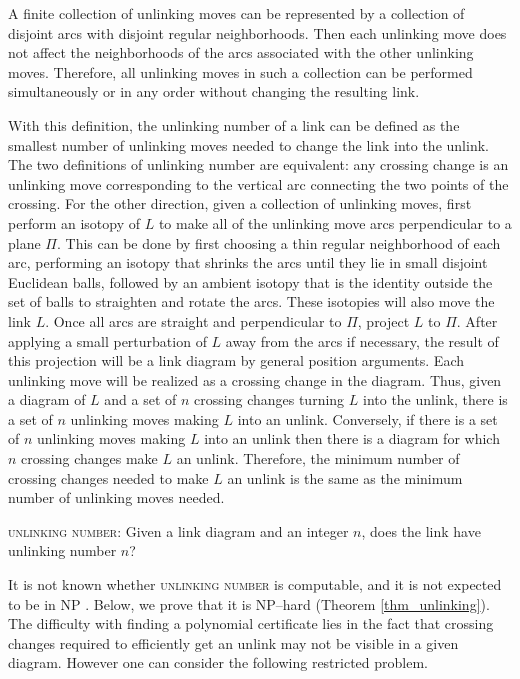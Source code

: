 \documentclass[12pt]{amsart}
\theoremstyle{definition}
\theoremstyle{remark}
\begin{document}
A finite collection of unlinking moves can be represented by a collection of disjoint arcs with disjoint regular neighborhoods.
Then each unlinking move does not affect the neighborhoods of the arcs associated with the other unlinking moves.
Therefore, all unlinking moves in such a collection can be performed simultaneously or in any order without changing the resulting link.


With this definition, the unlinking number of a link can be defined as the smallest number of unlinking moves needed to change the link into the unlink.
The two definitions of unlinking number are equivalent:  any crossing change is an unlinking move corresponding to the vertical arc connecting the two points of the crossing.
For the other direction, given a collection of unlinking moves, first perform an isotopy of $L$ to make all of the unlinking move arcs perpendicular to a plane $\Pi$.
This can be done by first choosing a thin regular neighborhood of each arc, performing an isotopy that shrinks the arcs until they lie in small disjoint Euclidean balls, followed by an ambient isotopy that is the identity outside the set of balls to straighten and rotate the arcs.
These isotopies will also move the link $L$.
Once all arcs are straight and perpendicular to $\Pi$, project $L$ to $\Pi$.
After applying a small perturbation of $L$ away from the arcs if necessary, the result of this projection will be a link diagram by general position arguments.
Each unlinking move will be realized as a crossing change in the diagram.
Thus, given a diagram of $L$ and a set of $n$ crossing changes turning $L$ into the unlink, there is a set of $n$ unlinking moves making $L$ into an unlink.
Conversely, if there is a set of $n$ unlinking moves making $L$ into an unlink then there is a diagram for which $n$ crossing changes make $L$ an unlink.
Therefore, the minimum number of crossing changes needed to make $L$ an unlink is the same as the minimum number of unlinking moves needed.


\vspace{0.14in}
\textsc{unlinking number}: Given a link diagram and an integer $n$, does the link  have unlinking number $n$?
\vspace{0.14in}


It is not known whether \textsc{unlinking number} is computable, and it is not expected to be in NP \cite{Lackenby3}.
Below, we prove that it is NP--hard (Theorem \ref{thm_unlinking}).
The difficulty with finding a polynomial certificate lies in the fact that crossing changes required to efficiently get an unlink may not be visible in a given diagram.
However one can consider the following restricted problem.
\end{document}
